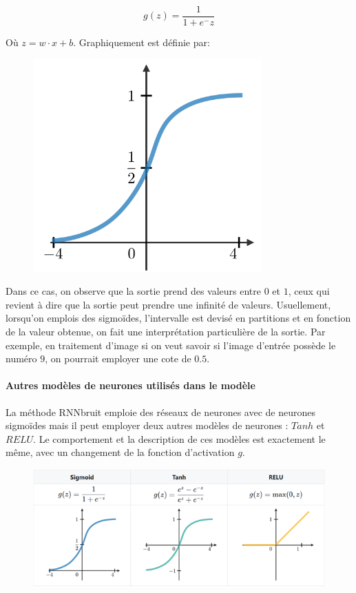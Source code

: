 \documentclass[conference,onecolumn]{IEEEtran}
\begin{document}
\begin{equation}
    g(z)=\dfrac{1}{1+e^-z}
\end{equation}

Où $z=w\cdot x+b$. Graphiquement est définie par:

 \begin{figure}[H]
 \centering
    \includegraphics[scale=0.5]{img10.png}
\end{figure}

Dans ce cas, on observe que la sortie prend des valeurs entre $0$ et $1$, ceux qui revient à dire que la sortie peut prendre une infinité de valeurs. Usuellement, lorsqu’on emplois des sigmoïdes, l’intervalle est devisé en partitions et en fonction de la valeur obtenue, on fait une interprétation particulière de la sortie. Par exemple, en traitement d’image si on veut savoir si l’image d’entrée possède le numéro $9$, on pourrait employer une cote de $0.5$.  


\paragraph{Autres modèles de neurones utilisés dans le modèle}
La méthode RNNbruit emploie des réseaux de neurones avec de neurones sigmoïdes mais il peut employer deux autres modèles de neurones : $Tanh$ et $RELU$. Le comportement et la description de ces modèles est exactement le même, avec un changement de la fonction d’activation $g$. 

 \begin{figure}[H]
 \centering
    \includegraphics[scale=0.7]{img11.png}
\end{figure}
\end{document}
